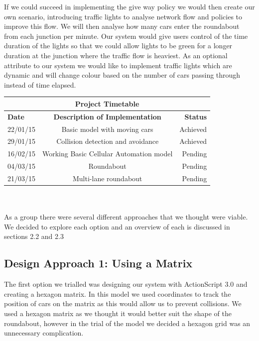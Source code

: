 \documentclass[11pt]{article}
\begin{document}
	If we could succeed in implementing the give way policy we would then create our own scenario, introducing traffic lights to analyse network flow and policies to improve this flow. We will then analyse how many cars enter the roundabout from each junction per minute. Our system would give users control of the time duration of the lights so that we could allow lights to be green for a longer duration at the junction where the traffic flow is heaviest. As an optional attribute to our system we would like to implement traffic lights which are dynamic and will change colour based on the number of cars passing through instead of time elapsed. \\
	
	
	\begin{tabular}{ | l | c | r | }
		\hline
		\multicolumn{3}{|c|}{\textbf{Project Timetable}}  \\ \hline
		\textbf{Date} & \textbf{Description of Implementation} & \textbf{Status} \\ \hline
		22/01/15 & Basic model with moving cars &  Achieved \\ \hline
		29/01/15 & Collision detection and avoidance & Achieved \\ \hline
		16/02/15 & Working Basic Cellular Automation model & Pending \\ \hline
		04/03/15 & Roundabout & Pending \\ \hline
		21/03/15 & Multi-lane roundabout & Pending \\ \hline
		
	\end{tabular}\\\\
	
		\noindent As a group there were several different approaches that we thought were viable. We decided to explore each option and an overview of each is discussed in sections 2.2 and 2.3
		\
	\subsection{Design Approach 1: Using a Matrix}

	
	The first option we trialled was designing our system with ActionScript 3.0 and creating a hexagon matrix. In this model we used coordinates to track the position of cars on the matrix as this would allow us to prevent collisions. We used a hexagon matrix as we thought it would better suit the shape of the roundabout, however in the trial of the model we decided a hexagon grid was an unnecessary complication. 
	
\end{document}
